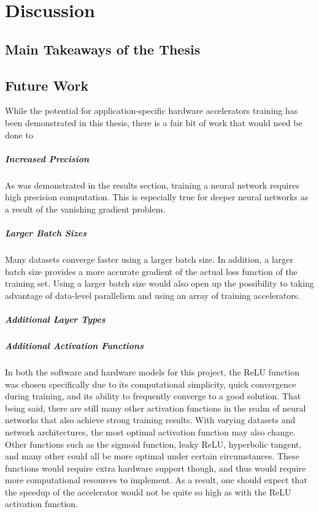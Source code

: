 \chapter{Discussion}


\section{Main Takeaways of the Thesis}

\section{Future Work}
While the potential for application-specific hardware accelerators training has been demonstrated in this thesis, there is a fair bit of work that would need be done to 

\paragraph{Increased Precision}
As was demonstrated in the results section, training a neural network requires high precision computation. This is especially true for deeper neural networks as a result of the vanishing gradient problem.

\paragraph{Larger Batch Sizes}
Many datasets converge faster using a larger batch size. In addition, a larger batch size provides a more accurate gradient of the actual loss function of the training set. Using a larger batch size would also open up the possibility to taking advantage of data-level parallelism and using an array of training accelerators. 

\paragraph{Additional Layer Types}

\paragraph{Additional Activation Functions}
In both the software and hardware models for this project, the ReLU function was chosen specifically due to its computational simplicity, quick convergence during training, and its ability to frequently converge to a good solution. That being said, there are still many other activation functions in the realm of neural networks that also achieve strong training results. With varying datasets and network architectures, the most optimal activation function may also change. Other functions such as the sigmoid function, leaky ReLU, hyperbolic tangent, and many other could all be more optimal under certain circumstances. These functions would require extra hardware support though, and thus would require more computational resources to implement. As a result, one should expect that the speedup of the accelerator would not be quite so high as with the ReLU activation function.

